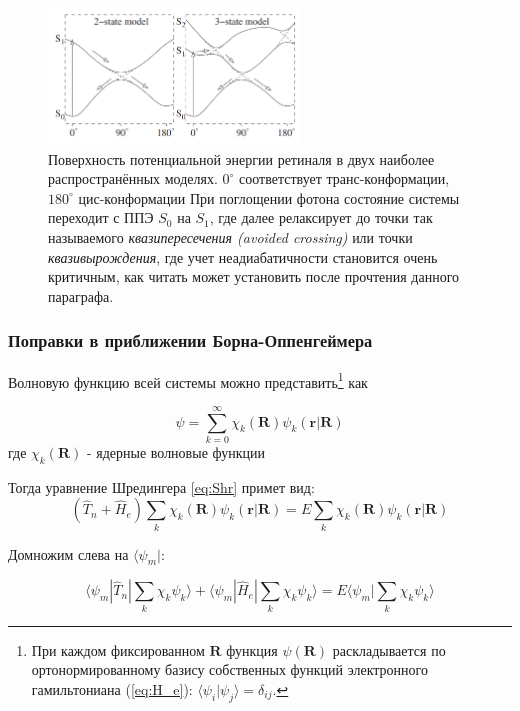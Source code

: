 \documentclass[12pt, oneside]{article}
\numberwithin{equation}{section}  %
\begin{document}
\begin{figure}[h] %
    \centering
    \includegraphics[width=0.6\textwidth]{./images/retinalePES.png}
    \caption{Поверхность потенциальной энергии ретиналя в двух наиболее распространённых моделях. \(0^{\circ}\) соответствует транс-конформации, \(180^{\circ}\) цис-конформации При поглощении фотона состояние системы переходит с ППЭ \(S_0\) на \(S_1\), где далее релаксирует до точки так называемого \textit{квазипересечения (avoided crossing)} или точки \textit{квазивырождения}, где учет неадиабатичности становится очень критичным, как читать может установить после прочтения данного параграфа.}
    \label{fig:retinalePES}
\end{figure}

\subsubsection*{Поправки в приближении Борна-Оппенгеймера}

Волновую функцию всей системы можно представить\footnote{При каждом фиксированном \(\bm{R}\) функция \(\psi(\bm{R})\) раскладывается по ортонормированному базису собственных функций электронного гамильтониана (\ref{eq:H_e}): \(\langle \psi_i | \psi_j \rangle = \delta_{ij}\).} как 

\begin{equation}
    \psi = \sum_{k=0}^{\infty} \chi_k (\bm{R}) \psi_k (\bm{r}| \bm{R})
\end{equation}
где \(\chi_k(\bm{R})\) - ядерные волновые функции


Тогда уравнение Шредингера \ref{eq:Shr} примет вид:
\begin{equation}
(\hat{T}_n + \hat{H}_e) \sum_k \chi_k (\bm{R}) \psi_k (\bm{r}| \bm{R}) = E \sum_k \chi_k (\bm{R}) \psi_k (\bm{r}| \bm{R})
\end{equation}

Домножим слева на \(\langle \psi_m|\):

\begin{equation}
\langle \psi_m | \hat{T}_n | \sum_k \chi_k \psi_k \rangle + \langle \psi_m | \hat{H}_e | \sum_k \chi_k \psi_k \rangle = E \langle \psi_m | \sum_k \chi_k \psi_k \rangle
\end{equation}
\end{document}

